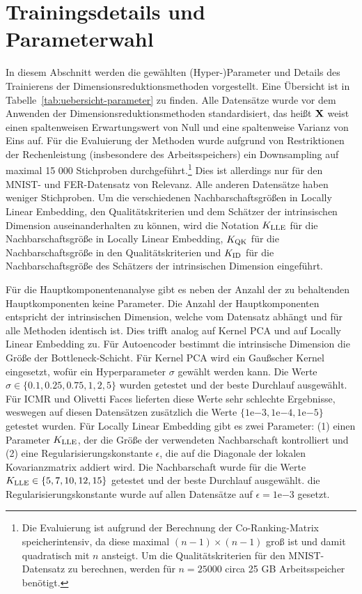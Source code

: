 \section{Trainingsdetails und Parameterwahl}
\label{ch:Vergleich:sec:ParameterwahlTrainingsdetails}

In diesem Abschnitt werden die gewählten (Hyper-)Parameter und Details des Trainierens der
Dimensionsreduktionsmethoden vorgestellt. Eine Übersicht ist in
Tabelle~\ref{tab:uebersicht-parameter} zu finden. Alle Datensätze wurde vor dem Anwenden der
Dimensionsreduktionsmethoden standardisiert, das heißt $\mathbf{X}$ weist einen spaltenweisen
Erwartungswert von Null und eine spaltenweise Varianz von Eins auf. Für die Evaluierung der
Methoden wurde aufgrund von Restriktionen der Rechenleistung (insbesondere des Arbeitsspeichers)
ein Downsampling auf maximal 15 000 Stichproben durchgeführt.\footnote{Die Evaluierung ist aufgrund
	der Berechnung der Co-Ranking-Matrix speicherintensiv, da diese maximal $(n-1) \times (n-1)$ groß
	ist und damit quadratisch mit $n$ ansteigt. Um die Qualitätskriterien für den MNIST-Datensatz zu
	berechnen, werden für $n=25 000$ circa 25 GB Arbeitsspeicher benötigt.} Dies ist allerdings nur für
den MNIST- und FER-Datensatz von Relevanz. Alle anderen Datensätze haben weniger Stichproben. Um
die verschiedenen Nachbarschaftsgrößen in Locally Linear Embedding, den Qualitätskriterien und dem
Schätzer der intrinsischen Dimension auseinanderhalten zu können, wird die Notation $K_{\text{LLE}}$ für die
Nachbarschaftsgröße in Locally Linear Embedding, $K_{\text{QK}}$ für die Nachbarschaftsgröße in den
Qualitätskriterien und $K_{\text{ID}}$ für die Nachbarschaftsgröße des Schätzers der intrinsischen Dimension
eingeführt.

Für die Hauptkomponentenanalyse gibt es neben der Anzahl der zu behaltenden Hauptkomponenten keine
Parameter. Die Anzahl der Hauptkomponenten entspricht der intrinsischen Dimension, welche vom
Datensatz abhängt und für alle Methoden identisch ist. Dies trifft analog auf Kernel PCA und auf
Locally Linear Embedding zu. Für Autoencoder bestimmt die intrinsische Dimension die Größe der
Bottleneck-Schicht. Für Kernel PCA wird ein Gaußscher Kernel eingesetzt, wofür ein Hyperparameter
$\sigma$ gewählt werden kann. Die Werte $\sigma \in \{ 0.1, 0.25, 0.75, 1, 2, 5\}$ wurden getestet
und der beste Durchlauf ausgewählt. Für ICMR und Olivetti Faces lieferten diese Werte sehr
schlechte Ergebnisse, weswegen auf diesen Datensätzen zusätzlich die Werte $\{ 1\mathrm{e}{-3},
	1\mathrm{e}{-4}, 1\mathrm{e}{-5}\}$ getestet wurden. Für Locally Linear Embedding gibt es zwei
Parameter: (1) einen Parameter $K_{\text{LLE}}$, der die Größe der verwendeten Nachbarschaft kontrolliert
und (2) eine Regularisierungskonstante $\epsilon$, die auf die Diagonale der lokalen
Kovarianzmatrix addiert wird. Die Nachbarschaft wurde für die Werte $K_{\text{LLE}} \in \{ 5, 7, 10, 12,
	15\}$ getestet und der beste Durchlauf ausgewählt. die Regularisierungskonstante wurde auf allen
Datensätze auf $\epsilon = 1\mathrm{e}{-3}$ gesetzt.

